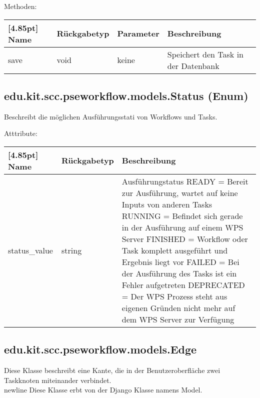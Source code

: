 			Methoden:
			\begin{center}
				\setlength\tabcolsep{5pt}
				\renewcommand{\arraystretch}{1.5}
				
				\begin{tabularx}{\textwidth}{|l|l|l|X|}
					\hline
					\rowcolor[gray]{0.75}[4.85pt]
					Name & Rückgabetyp & Parameter & Beschreibung \\ \hline
				    save & void & keine & Speichert den Task in der Datenbank \\ 
					\hline
				\end{tabularx}
			\end{center}			
		\subsection{edu.kit.scc.pseworkflow.models.Status (Enum)}	
			Beschreibt die möglichen Ausführungsstati von Workflows und Tasks. \newline
			
			Atttribute:
			\begin{center}
				\setlength\tabcolsep{5pt}
				\renewcommand{\arraystretch}{1.5}
				
				\begin{tabularx}{\textwidth}{|l|l|X|}
					\hline
					\rowcolor[gray]{0.75}[4.85pt]
					Name & Rückgabetyp & Beschreibung \\ \hline 
	           		status\_value & string & Ausführungstatus\newline
	           		READY = Bereit zur Ausführung, wartet auf keine Inputs von anderen Tasks \newline
	           		RUNNING = Befindet sich gerade in der Ausführung auf einem WPS Server \newline 
	           		FINISHED = Workflow oder Task komplett ausgeführt und Ergebnis liegt vor \newline
	           		FAILED = Bei der Ausführung des Tasks ist ein Fehler aufgetreten \newline
	           		DEPRECATED = Der WPS Prozess steht aus eigenen Gründen nicht mehr auf dem WPS Server zur Verfügung \\
	           		\hline
				\end{tabularx}
			\end{center}
        \subsection{edu.kit.scc.pseworkflow.models.Edge}	
    			Diese Klasse beschreibt eine Kante, die in der Benutzeroberfläche zwei Taskknoten miteinander verbindet. \\newline
    			Diese Klasse erbt von der Django Klasse namens \glqq Model\grqq .
    			
